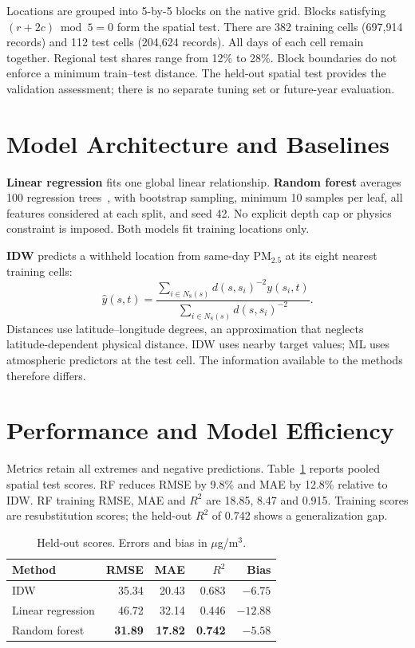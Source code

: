 \documentclass[conference]{IEEEtran}
\begin{document}
Locations are grouped into 5-by-5 blocks on the native grid. Blocks satisfying $(r+2c)\bmod 5=0$ form the spatial test. There are 382 training cells (697,914 records) and 112 test cells (204,624 records). All days of each cell remain together. Regional test shares range from 12\% to 28\%. Block boundaries do not enforce a minimum train--test distance. The held-out spatial test provides the validation assessment; there is no separate tuning set or future-year evaluation.
\section{Model Architecture and Baselines}
\textbf{Linear regression} fits one global linear relationship. \textbf{Random forest} averages 100 regression trees~\cite{breiman,sklearn}, with bootstrap sampling, minimum 10 samples per leaf, all features considered at each split, and seed 42. No explicit depth cap or physics constraint is imposed. Both models fit training locations only.

\textbf{IDW} predicts a withheld location from same-day PM$_{2.5}$ at its eight nearest training cells:
\begin{equation}
\hat y(s,t)=\frac{\sum_{i\in N_8(s)}d(s,s_i)^{-2}y(s_i,t)}{\sum_{i\in N_8(s)}d(s,s_i)^{-2}}.
\end{equation}
Distances use latitude--longitude degrees, an approximation that neglects latitude-dependent physical distance. IDW uses nearby target values; ML uses atmospheric predictors at the test cell. The information available to the methods therefore differs.
\section{Performance and Model Efficiency}
Metrics retain all extremes and negative predictions. Table~\ref{tab:overall} reports pooled spatial test scores. RF reduces RMSE by 9.8\% and MAE by 12.8\% relative to IDW. RF training RMSE, MAE and $R^2$ are 18.85, 8.47 and 0.915. Training scores are resubstitution scores; the held-out $R^2$ of 0.742 shows a generalization gap.
\begin{table}[t]\caption{Held-out scores. Errors and bias in $\mu$g/m$^3$.}\label{tab:overall}\centering
\begin{tabular}{lrrrr}\toprule Method&RMSE&MAE&$R^2$&Bias\\\midrule
IDW&35.34&20.43&0.683&$-6.75$\\
Linear regression&46.72&32.14&0.446&$-12.88$\\
Random forest&\textbf{31.89}&\textbf{17.82}&\textbf{0.742}&$-5.58$\\\bottomrule\end{tabular}\end{table}
\end{document}
